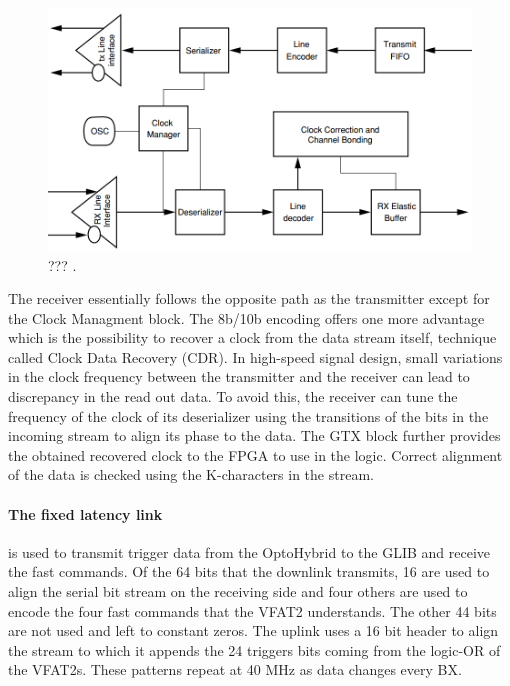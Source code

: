      \begin{figure}[h!]
        \centering
        \includegraphics[width=\textwidth]{img/II-3-test-beam/gtx.png}
        \caption{??? \cite{GTX}.}
        \label{fig:II-3-gtx}
      \end{figure}

      The receiver essentially follows the opposite path as the transmitter except for the Clock Managment block. The 8b/10b encoding offers one more advantage which is the possibility to recover a clock from the data stream itself, technique called Clock Data Recovery (CDR). In high-speed signal design, small variations in the clock frequency between the transmitter and the receiver can lead to discrepancy in the read out data. To avoid this, the receiver can tune the frequency of the clock of its deserializer using the transitions of the bits in the incoming stream to align its phase to the data. The GTX block further provides the obtained recovered clock to the FPGA to use in the logic. Correct alignment of the data is checked using the K-characters in the stream.

      \paragraph{The fixed latency link} is used to transmit trigger data from the OptoHybrid to the GLIB and receive the fast commands. Of the 64 bits that the downlink transmits, 16 are used to align the serial bit stream on the receiving side and four others are used to encode the four fast commands that the VFAT2 understands. The other 44 bits are not used and left to constant zeros. The uplink uses a 16 bit header to align the stream to which it appends the 24 triggers bits coming from the logic-OR of the VFAT2s. These patterns repeat at 40 MHz as data changes every BX.

